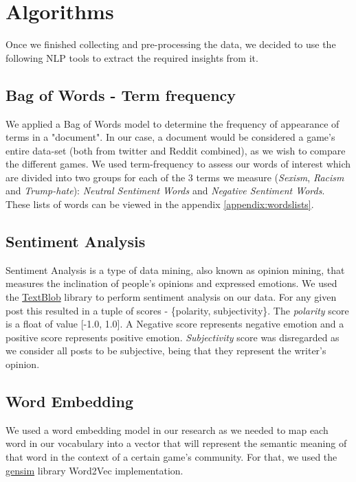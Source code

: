 \section{Algorithms}
Once we finished collecting and pre-processing the data, we decided to use the following NLP tools to extract the required insights from it.


\subsection{Bag of Words - Term frequency}
We applied a Bag of Words model to determine the frequency of appearance of terms in a "document". In our case, a document would be considered a game's entire data-set (both from twitter and Reddit combined), as we wish to compare the different games. 
We used term-frequency to assess our words of interest which are divided into two groups for each of the 3 terms we measure (\emph{Sexism}, \emph{Racism} and \emph{Trump-hate}): \emph{Neutral Sentiment Words} and \emph{Negative Sentiment Words}. These lists of words can be viewed in the appendix \ref{appendix:wordslists}.

\subsection{Sentiment Analysis}
Sentiment Analysis \cite{liu2012sentiment} is a type of data mining, also known as opinion mining, that measures the inclination of people’s opinions and expressed emotions. 
We used the \href{https://textblob.readthedocs.io/en/dev/}{TextBlob} library to perform sentiment analysis on our data. 
For any given post this resulted in a tuple of scores - \{polarity, subjectivity\}. 
The \emph{polarity} score is a float of value [-1.0, 1.0]. 
A Negative score represents negative emotion and a positive score represents positive emotion. \emph{Subjectivity} score was disregarded as we consider all posts to be subjective, being that they represent the writer's opinion.



\subsection{Word Embedding}
We used a word embedding model \cite{mikolov2013distributed} in our research as we needed to map each word in our vocabulary into a vector that will represent the semantic meaning of that word in the context of a certain game's community.
For that, we used the \href{https://radimrehurek.com/gensim/models/word2vec.html}{gensim} library Word2Vec implementation.

